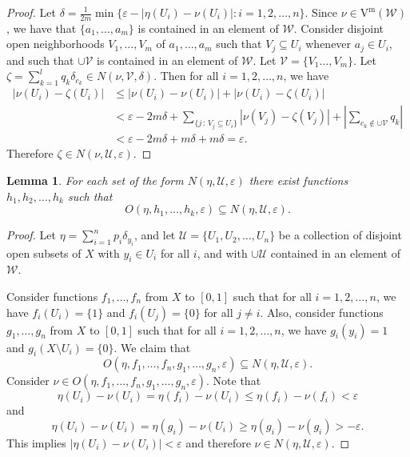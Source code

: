 \documentclass[11pt, reqno, english]{amsart}
\theoremstyle{plain}
\newtheorem{lemma}{Lemma}[section]
\theoremstyle{definition}
\theoremstyle{myremark}
\newcommand{\cU}{\mathcal{U}}
\newcommand{\cV}{\mathcal{V}}
\newcommand{\cW}{\mathcal{W}}
\newcommand{\diam}{\mathrm{diam}}
\newcommand{\vietm}[1]{\mathrm{V}^\mathrm{m}(#1)}
\newcommand{\vrm}[2]{\mathrm{VR}^\mathrm{m}(#1;#2)}
\begin{document}
\begin{proof}
Let $\delta = \frac{1}{2m}\min\{\varepsilon - |\eta(U_i) - \nu(U_i)|:i=1,2,\dots,n\}$.
Since $\nu\in \vietm{\cW}$, we have that $\{a_1,\ldots,a_m\}$ is contained in an element of $\cW$.
Consider disjoint open neighborhoods $V_1,\dots , V_m$ of $a_1,\dots , a_m$ such that $V_j\subseteq U_i$ whenever $a_j\in U_i$, and such that $\cup\cV$ is contained in an element of $\cW$.
Let $\cV = \{V_1\ldots,V_m\}$.
Let $\zeta =\sum_{k=1}^l q_k \delta_{c_k}\in  N(\nu,\cV,\delta)$.
Then for all $i=1,2, \dots, n$, we have
\begin{align*}
|\nu(U_i) - \zeta (U_i)|
&\le |\nu(U_i) - \nu(U_i)| + |\nu(U_i) - \zeta(U_i)| \\
&< \varepsilon - 2m \delta + \sum_{\{j\,:\,V_j\subseteq U_i\}} |\nu (V_j) -\zeta (V_j)| + \left|\sum_{c_k\notin \cup\cV} q_k \right| \\
&< \varepsilon - 2m\delta + m\delta + m \delta = \varepsilon.
\end{align*}
Therefore $\zeta \in N(\nu,\cU,\varepsilon)$.
\end{proof}





\begin{lemma}
\label{lemma:basis2}
For each set of the form $N(\eta,\cU,\varepsilon)$ there exist functions $h_1,h_2,\dots, h_k$ such that
\[O(\eta, h_1,\dots, h_k, \varepsilon)\subseteq N(\eta,\cU,\varepsilon).\]
\end{lemma}

\begin{proof}
Let $\eta = \sum_{i=1}^n p_i \delta_{y_i}$, and let $\cU=\{U_1, U_2, \dots, U_n\}$ be a collection of disjoint open subsets of $X$ with $y_i\in U_i$ for all $i$, and with $\cup\cU$ contained in an element of $\cW$.

Consider functions $f_1,\dots, f_n$ from $X$ to $[0,1]$ such that for all $i=1,2,\dots,n$, we have $f_i(U_i)=\{1\}$ and $f_i(U_j) =\{0\}$ for all $j\ne i$.
Also, consider functions $g_1,\dots, g_n$ from $X$ to $[0,1]$ such that for all $i=1,2,\dots,n$, we have $g_i(y_i) = 1$ and $g_i(X\setminus U_i) =\{0\}$.
We claim that 
\[O(\eta, f_1,\dots, f_n, g_1,\dots, g_n, \varepsilon)\subseteq N(\eta,\cU,\varepsilon).\]
Consider $\nu \in O(\eta, f_1,\dots, f_n, g_1,\dots, g_n, \varepsilon)$.
Note that 
\[\eta(U_i) - \nu (U_i) = \eta(f_i) - \nu (U_i) \le \eta (f_i) - \nu (f_i) <\varepsilon\]
and
\[\eta (U_i) - \nu(U_i) = \eta (g_i) - \nu (U_i) \ge \eta (g_i) - \nu (g_i) > -\varepsilon.\]
This implies $|\eta (U_i) - \nu (U_i)|< \varepsilon$ and therefore $\nu \in N(\eta,\cU,\varepsilon)$.
\end{proof}
\end{document}
